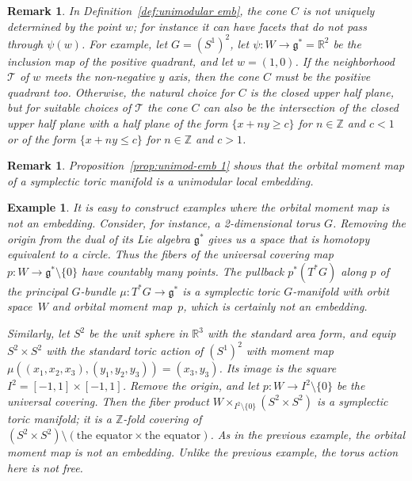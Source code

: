 \documentclass[10pt,a4paper]{amsart}
\numberwithin{equation}{section}
\newtheorem{Example}[Lemma]{Example}
\newtheorem{Remark}[Lemma]{Remark}
\begin{document}
\begin{Remark}
In Def\/inition~\ref{def:unimodular emb},
the cone $C$ is not uniquely determined by the point $w$;
for instance it can have facets that do not pass through $\psi(w)$.
For example, let $G = (S^1)^2$, let $\psi \colon W \to {\mathfrak g}^* = {\mathbb R}^2$
be the inclusion map of the positive quadrant, and let $w = (1,0)$.
If the neighborhood ${\mathcal T}$ of $w$ meets the non-negative $y$ axis,
then the cone $C$ must be the positive quadrant too.  Otherwise,
the natural choice for $C$ is the closed upper half plane,
but for suitable choices of ${\mathcal T}$ the cone $C$ can also be
the intersection of the closed upper half plane
with a half plane of the form $\{ x+ny \geq c \}$ for $n \in {\mathbb Z}$ and $c<1$
or of the form $\{ x+ny \leq c \}$ for $n \in {\mathbb Z}$ and $c>1$.
\end{Remark}

\begin{Remark}
  Proposition~\ref{prop:unimod-emb 1} shows that the orbital moment
  map of a symplectic toric manifold is a unimodular local embedding.
\end{Remark}

\begin{Example} \label{ex:mmap-not-emb}
  It is easy to construct examples where the orbital moment map is not
  an embedding.  Consider, for instance, a 2-dimensional torus $G$.
  Removing the origin from the dual of its Lie algebra ${\mathfrak g}^*$ gives
  us a space
   that is
  homotopy equivalent to a circle.  Thus the f\/ibers of the
  universal covering map $p \colon W\to {\mathfrak g}^*\setminus \{0\}$ have
  countably many points.  The pullback $p^*(T^*G)$ along $p$ of the
  principal $G$-bundle $\mu \colon T^*G \to {\mathfrak g}^*$ is a symplectic toric
  $G$-manifold with orbit space~$W$ and orbital moment map~$p$, which is
  certainly not an embedding.

Similarly, let $S^2$ be the unit sphere in ${\mathbb R}^3$ with the standard
area form, and equip~$S^2 \times S^2$ with the standard toric action
of $(S^1)^2$ with moment map $\mu((x_1,x_2,x_3),(y_1,y_2,y_3)) = (x_3,y_3)$.
Its image is the square $I^2 = [-1,1] \times [-1,1]$.
Remove the origin, and let
$p \colon W \to I^2 \setminus \{ 0 \}$ be the universal covering.
Then the f\/iber product $W \times_{I^2 \setminus \{ 0 \} } (S^2 \times S^2)$
is a symplectic toric manifold; it is a ${\mathbb Z}$-fold covering
of $(S^2 \times S^2) \setminus ( \text{the equator} \times \text{the equator})$.
As in the previous example, the orbital moment map is not an embedding.
Unlike the previous example, the torus action  here is not free.
\end{Example}
\end{document}
